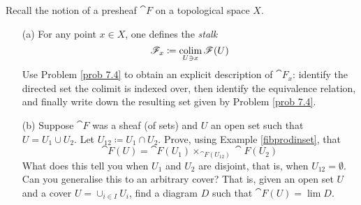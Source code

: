 \vspace*{0.1in}

\begin{problem}\label{prob 7.5}
Recall the notion of a presheaf $\cat{F}$ on a topological space $X$.
\begin{itemize}
\item[(a)] For any point $x \in X$, one defines the \emph{stalk}
\[\mathscr{F}_x \coloneqq \underset{U \ni x}{\operatorname{colim}}\,\mathscr{F}(U)\]
Use Problem \ref{prob 7.4} to obtain an explicit description of $\cat{F}_x$: identify the directed set the colimit is indexed over, then identify the equivalence relation, and finally write down the resulting set given by Problem \ref{prob 7.4}.
\item[(b)] Suppose $\cat{F}$ was a sheaf (of sets) and $U$ an open set such that $U = U_1 \cup U_2$. Let $U_{12} \coloneqq U_1 \cap U_2$. Prove, using Example \ref{fibprodinset}, that
\[\cat{F}(U) = \cat{F}(U_1) \times_{\cat{F}(U_{12})}\cat{F}(U_2)\]
What does this tell you when $U_1$ and $U_2$ are disjoint, that is, when $U_{12} = \emptyset$.\\[1em]
Can you generalise this to an arbitrary cover? That is, given an open set $U$ and a cover $U = \cup_{i \in I}U_i$, find a diagram $D$ such that $\cat{F}(U) = \lim D$.
\end{itemize}
\end{problem}